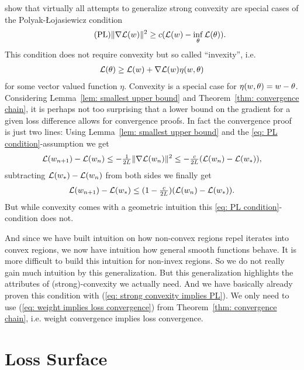 \textcite{karimiLinearConvergenceGradient2020} show that virtually all
attempts to generalize strong convexity are special cases of the
Polyak-\L{}ojasiewicz condition
\begin{align}
	\label{eq: PL condition}\tag{PL}
	\|\nabla \mathcal{L}(w) \|^2 \ge c(\mathcal{L}(w)-\inf_{\theta}\mathcal{L}(\theta)).
\end{align}
This condition does not require convexity but so called ``invexity'', i.e.
\begin{align*}
	\mathcal{L}(\theta) \ge \mathcal{L}(w) + \nabla\mathcal{L}(w)\eta(w, \theta)
\end{align*}
for some vector valued function \(\eta\). Convexity is a special case for \(\eta(w,
\theta)=w-\theta\). Considering Lemma~\ref{lem: smallest upper bound}
and Theorem~\ref{thm: convergence chain}, it is perhaps not too surprising that a
lower bound on the gradient for a given loss difference allows for
convergence proofs. In fact the convergence proof is just two lines:
Using Lemma~\ref{lem: smallest upper bound} and the \ref{eq: PL condition}-assumption we get
\begin{align*}
	\mathcal{L}(w_{n+1})- \mathcal{L}(w_n) \le -\tfrac1{2L} \|\nabla\mathcal{L}(w_n)\|^2
	\le -\tfrac{c}{2L}(\mathcal{L}(w_n) - \mathcal{L}(w_*)),
\end{align*}
subtracting \(\mathcal{L}(w_*)-\mathcal{L}(w_n)\) from both sides we finally get
\begin{align*}
	\mathcal{L}(w_{n+1}) - \mathcal{L}(w_*)
	\le (1-\tfrac{c}{2L})(\mathcal{L}(w_n) - \mathcal{L}(w_*)).
\end{align*}
But while convexity comes with a geometric intuition this \ref{eq: PL
condition}-condition does not.

And since we have built intuition on how non-convex regions
repel iterates into convex regions, we now have intuition how general smooth
functions behave. It is more difficult to build this intuition for non-invex
regions. So we do not really gain much intuition by this generalization. But
this generalization highlights the attributes of (strong)-convexity we
actually need. And we have basically already proven this condition with
(\ref{eq: strong convexity implies PL}). We only need to use (\ref{eq: weight
implies loss convergence}) from Theorem~\ref{thm: convergence chain}, i.e.
weight convergence implies loss convergence.

\section{Loss Surface}\label{sec: loss surface}

